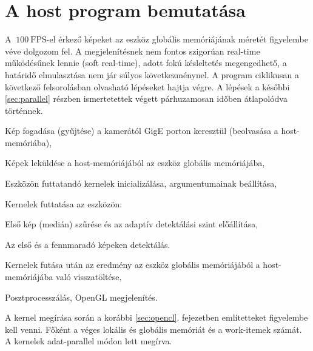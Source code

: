\chapter{A host program bemutatása}
	A $~100\ \mathrm{FPS}$-el érkező képeket az eszköz globális memóriájának méretét figyelembe véve dolgozom fel.
	A megjelenítésnek nem fontos szigorúan real-time működésűnek lennie (soft real-time), adott fokú késleltetés megengedhető, a
	határidő elmulasztása nem jár súlyos következménynel. A program ciklikusan a következő felsorolásban olvasható lépéseket hajtja
	végre. A lépések a későbbi \ref{sec:parallel} részben ismertetettek végett párhuzamosan időben átlapolódva történnek. 
	\begin{enumerate*}
		\item Kép fogadása (gyűjtése) a kamerától GigE porton keresztül (beolvasása a host-memóriába),
		\item Képek leküldése a host-memóriájából az eszköz globális memóriájába,
		\item Eszközön futtatandó kernelek inicializálása, argumentumainak beállítása,
		\item Kernelek futtatása az eszközön:
		\begin{enumerate*}
			\item Első kép (medián) szűrése és az adaptív detektálási szint előállítása,
			\item Az első és a fennmaradó képeken detektálás.
		\end{enumerate*}
		\item Kernelek futása után az eredmény az eszköz globális memóriájából a host-memóriájába való
		visszatöltése,
		\item Posztprocesszálás, OpenGL megjelenítés.
	\end{enumerate*}
	A kernel megírása során a korábbi \ref{sec:opencl}. fejezetben említetteket figyelembe kell venni.
	Főként a véges lokális és globális memóriát és a work-itemek számát. A kernelek adat-parallel módon lett megírva.
	
